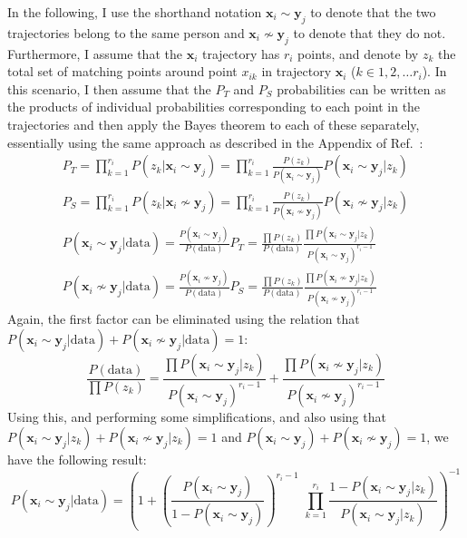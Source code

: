 \documentclass[a4paper]{article}
\renewcommand{\vec}[1]{\mathbf{#1}}
\begin{document}
		In the following, I use the shorthand notation $\vec{x}_i \sim \vec{y}_j$ to denote that the two trajectories belong to the same person and
		$\vec{x}_i \nsim \vec{y}_j$ to denote that they do not. Furthermore, I assume that the $\vec{x}_i$ trajectory has $r_i$ points, and denote
		by $z_k$ the total set of matching points around point $x_{ik}$ in trajectory $\vec{x}_i$ ($k \in 1,2,\ldots r_i$). In this scenario, I then
		assume that the $P_T$ and $P_S$ probabilities can be written as the products of individual probabilities corresponding to each point in the
		trajectories and then apply the Bayes theorem to each of these separately, essentially using the same approach as described in the Appendix
		of Ref.~\cite{Juhasz}:
		\begin{gather}
			P_T = \prod_{k=1}^{r_i} P ( z_k | \vec{x}_i \sim \vec{y}_j ) = \prod_{k=1}^{r_i} \frac{P(z_k)}{P( \vec{x}_i \sim \vec{y}_j)}
				P( \vec{x}_i \sim \vec{y}_j | z_k ) \\
			P_S = \prod_{k=1}^{r_i} P ( z_k | \vec{x}_i \nsim \vec{y}_j ) = \prod_{k=1}^{r_i} \frac{P(z_k)}{P( \vec{x}_i \nsim \vec{y}_j)}
				P( \vec{x}_i \nsim \vec{y}_j | z_k ) \\
			P( \vec{x}_i \sim \vec{y}_j | \textrm{data} ) = \frac{P( \vec{x}_i \sim \vec{y}_j )}{P( \textrm{data} )} P_T = 
				\frac{\prod P(z_k)}{P( \textrm{data} )} \frac{ \prod P( \vec{x}_i \sim \vec{y}_j | z_k ) }{ P( \vec{x}_i \sim \vec{y}_j)^{r_i-1}} \\
			P( \vec{x}_i \nsim \vec{y}_j | \textrm{data} ) = \frac{P( \vec{x}_i \nsim \vec{y}_j )}{P( \textrm{data} )} P_S = 
				\frac{\prod P(z_k)}{P( \textrm{data} )} \frac{ \prod P( \vec{x}_i \nsim \vec{y}_j | z_k ) }{ P( \vec{x}_i \nsim \vec{y}_j)^{r_i-1}}
		\end{gather}
		Again, the first factor can be eliminated using the relation that $P( \vec{x}_i \sim \vec{y}_j | \textrm{data} ) + P( \vec{x}_i %
		\nsim \vec{y}_j | \textrm{data} ) = 1$:
		\begin{equation}
			\frac{P( \textrm{data} )}{\prod P(z_k)} = \frac{ \prod P( \vec{x}_i \sim \vec{y}_j | z_k ) }{ P( \vec{x}_i \sim \vec{y}_j)^{r_i-1}} +
				\frac{ \prod P( \vec{x}_i \nsim \vec{y}_j | z_k ) }{ P( \vec{x}_i \nsim \vec{y}_j)^{r_i-1}}
		\end{equation}
		Using this, and performing some simplifications, and also using that $P( \vec{x}_i \sim \vec{y}_j | z_k ) + P( \vec{x}_i \nsim \vec{y}_j | z_k ) %
		= 1$ and $P( \vec{x}_i \sim \vec{y}_j) + P( \vec{x}_i \nsim \vec{y}_j) = 1$, we have the following result:
		\begin{equation}
			P( \vec{x}_i \sim \vec{y}_j | \textrm{data} ) =  \left ( 1 + \left ( \frac{P( \vec{x}_i \sim \vec{y}_j)}{1-P( \vec{x}_i \sim \vec{y}_j)}
				\right )^{r_i-1} \, \, \prod_{k=1}^{r_i} \frac{ 1 - P( \vec{x}_i \sim \vec{y}_j | z_k ) }{ P( \vec{x}_i \sim \vec{y}_j | z_k ) } \right )^{-1}
		\end{equation}
\end{document}
